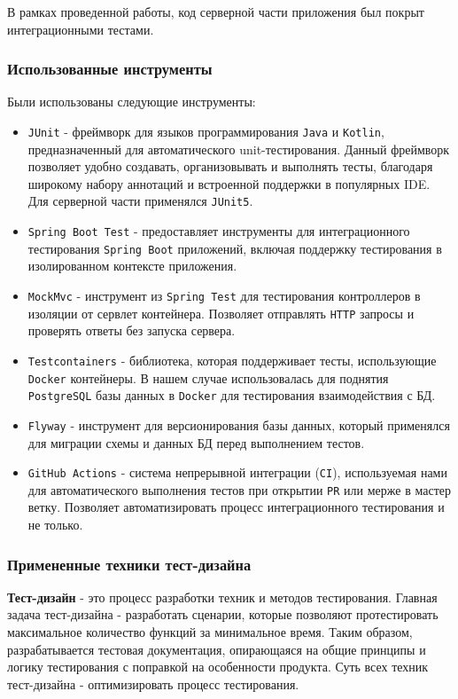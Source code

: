 \documentclass[a4paper, 14pt]{article}
\begin{document}
В рамках проведенной работы, код серверной части приложения был покрыт интеграционными тестами.

\subsubsection{Использованные инструменты}

Были использованы следующие инструменты:

\begin{itemize}
    \item \texttt{JUnit} - фреймворк для языков программирования \texttt{Java} и \texttt{Kotlin}, предназначенный для автоматического unit-тестирования. Данный фреймворк позволяет удобно создавать, организовывать и выполнять тесты, благодаря широкому набору аннотаций и встроенной поддержки в популярных IDE. Для серверной части применялся \texttt{JUnit5}.
    \item \texttt{Spring Boot Test} - предоставляет инструменты для интеграционного тестирования \texttt{Spring Boot} приложений, включая поддержку тестирования в изолированном контексте приложения.
    \item \texttt{MockMvc} - инструмент из \texttt{Spring Test} для тестирования контроллеров в изоляции от сервлет контейнера. Позволяет отправлять \texttt{HTTP} запросы и проверять ответы без запуска сервера.
    \item \texttt{Testcontainers} - библиотека, которая поддерживает тесты, использующие \texttt{Docker} контейнеры. В нашем случае использовалась для поднятия \texttt{PostgreSQL} базы данных в \texttt{Docker} для тестирования взаимодействия с БД.
    \item \texttt{Flyway} - инструмент для версионирования базы данных, который применялся для миграции схемы и данных БД перед выполнением тестов.
    \item \texttt{GitHub Actions} - система непрерывной интеграции (\texttt{CI}), используемая нами для автоматического выполнения тестов при открытии \texttt{PR} или мерже в мастер ветку. Позволяет автоматизировать процесс интеграционного тестирования и не только.
\end{itemize}

\subsubsection{Примененные техники тест-дизайна}

\textbf{Тест-дизайн} - это процесс разработки техник и методов тестирования. Главная задача тест-дизайна - разработать сценарии, которые позволяют протестировать максимальное количество функций за минимальное время. Таким образом, разрабатывается тестовая документация, опирающаяся на общие принципы и логику тестирования с поправкой на особенности продукта. Суть всех техник тест-дизайна - оптимизировать процесс тестирования.
\end{document}
